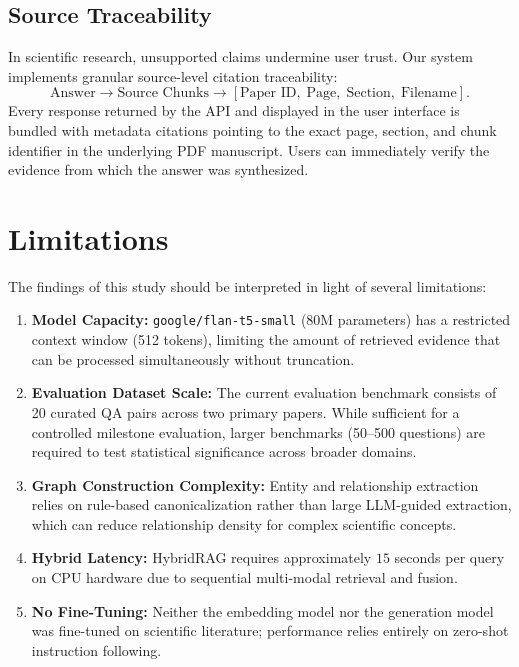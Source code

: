 \documentclass[conference]{IEEEtran}
\begin{document}
\subsection{Source Traceability}
In scientific research, unsupported claims undermine user trust. Our system implements granular source-level citation traceability:
\begin{equation*}
\text{Answer} \longrightarrow \text{Source Chunks} \longrightarrow [\text{Paper ID},\; \text{Page},\; \text{Section},\; \text{Filename}].
\end{equation*}
Every response returned by the API and displayed in the user interface is bundled with metadata citations pointing to the exact page, section, and chunk identifier in the underlying PDF manuscript. Users can immediately verify the evidence from which the answer was synthesized.


\section{Limitations}

The findings of this study should be interpreted in light of several limitations:
\begin{enumerate}
\item \textbf{Model Capacity:} \texttt{google/flan-t5-small} (80M parameters) has a restricted context window (512 tokens), limiting the amount of retrieved evidence that can be processed simultaneously without truncation.
\item \textbf{Evaluation Dataset Scale:} The current evaluation benchmark consists of 20 curated QA pairs across two primary papers. While sufficient for a controlled milestone evaluation, larger benchmarks (50--500 questions) are required to test statistical significance across broader domains.
\item \textbf{Graph Construction Complexity:} Entity and relationship extraction relies on rule-based canonicalization rather than large LLM-guided extraction, which can reduce relationship density for complex scientific concepts.
\item \textbf{Hybrid Latency:} HybridRAG requires approximately $15$ seconds per query on CPU hardware due to sequential multi-modal retrieval and fusion.
\item \textbf{No Fine-Tuning:} Neither the embedding model nor the generation model was fine-tuned on scientific literature; performance relies entirely on zero-shot instruction following.
\end{enumerate}
\end{document}
